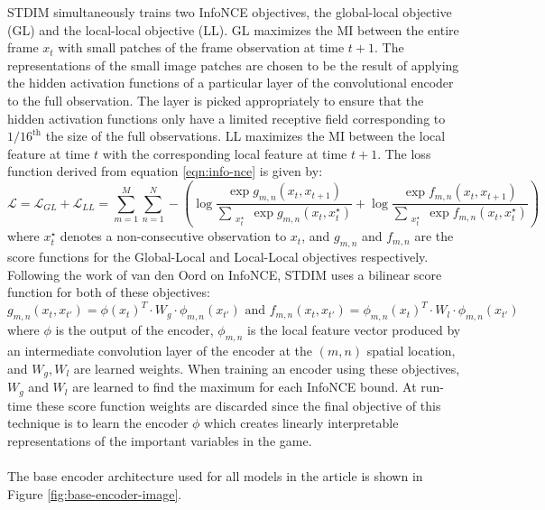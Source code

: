 STDIM simultaneously trains two InfoNCE objectives, the global-local objective (GL) and the local-local objective (LL). GL maximizes the MI between the entire frame $x_t$ with small patches of the frame observation at time $t+1$. The representations of the small image patches are chosen to be the result of applying the hidden activation functions of a particular layer of the convolutional encoder to the full observation. The layer is picked appropriately to ensure that the hidden activation functions only have a limited receptive field corresponding to $1/16^{\text{th}}$ the size of the full observations. LL maximizes the MI between the local feature at time $t$ with the corresponding local feature at time $t+1$. The loss function derived from equation \ref{eqn:info-nce} is given by:
\begin{equation}
\mathcal{L}=\mathcal{L}_{GL}+\mathcal{L}_{LL}=\sum_{m=1}^M\sum_{n=1}^N-\left(\log{\frac{\exp{g_{m,n}(x_t,x_{t+1})}}{\sum\limits_{\substack{x_t^\star}} \exp{g_{m,n}(x_t,x_t^\star)}}}+\log{\frac{\exp{f_{m,n}(x_t,x_{t+1})}}{\sum\limits_{\substack{x_t^\star}} \exp{f_{m,n}(x_t,x_t^\star)}}}\right)
\label{eqn:loss-functions}
\end{equation}
where $x_t^\star$ denotes a non-consecutive observation to $x_t$, and $g_{m,n}$ and $f_{m,n}$ are the score functions for the Global-Local and Local-Local objectives respectively. Following the work of van den Oord \cite{infoNCE} on InfoNCE, STDIM uses a bilinear score function for both of these objectives: 
\begin{equation}
g_{m,n}(x_t, x_{t'}) = \phi(x_t)^T \cdot W_g \cdot \phi_{m,n}(x_{t'})\text{ and }  f_{m,n}(x_t, x_{t'}) = \phi_{m,n}(x_t)^T\cdot W_l\cdot \phi_{m,n}(x_{t'})
\label{eqn:bilinear}
\end{equation}
where $\phi$ is the output of the encoder, $\phi_{m,n}$ is the local feature vector produced by an intermediate convolution layer of the encoder at the $(m,n)$ spatial location, and $W_g,W_l$ are learned weights. When training an encoder using these objectives, $W_g$ and $W_l$ are learned to find the maximum for each InfoNCE bound. At run-time these score function weights are discarded since the final objective of this technique is to learn the encoder $\phi$ which creates linearly interpretable representations of the important variables in the game.
\\\\
The base encoder architecture used for all models in the article is shown in Figure \ref{fig:base-encoder-image}.
